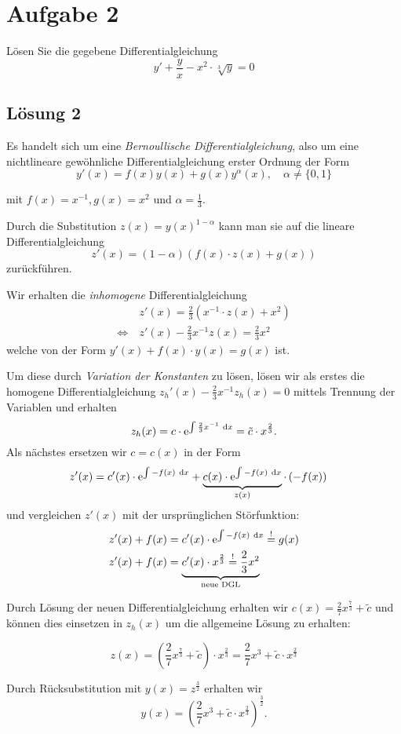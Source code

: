 \documentclass[main.tex]{subfiles}
\begin{document}
\section{Aufgabe 2}
Lösen Sie die gegebene Differentialgleichung
\[
    y' + \frac{y}{x} - x^2 \cdot \sqrt[3]{y} = 0
\]

\subsection{Lösung 2}

Es handelt sich um eine \textit{Bernoullische Differentialgleichung}, also um eine nichtlineare gewöhnliche Differentialgleichung erster Ordnung der Form
$$
    y'(x)=f(x)y(x) + g(x)y^\alpha(x), \quad \alpha \neq \{0,1\}
$$

mit $f(x)= x^{-1}, g(x)=x^2$ und $\alpha = \frac{1}{3}$.

Durch die Substitution $z(x) = y(x)^{1-\alpha}$ kann man sie auf die lineare Differentialgleichung
$$
    z'(x) = (1-\alpha)\left( f(x)\cdot z(x) + g(x) \right)
$$
zurückführen.

Wir erhalten die \textit{inhomogene} Differentialgleichung
\begin{align*}
    & z'(x) = \frac{2}{3}\left( x^{-1}\cdot z(x) + x^2 \right) \\[2mm]
    \Leftrightarrow\ & z'(x) - \frac{2}{3} x^{-1} z(x) = \frac{2}{3} x^2
\end{align*}
welche von der Form $y'(x) + f(x)\cdot y(x) = g(x)$ ist.

Um diese durch \textit{Variation der Konstanten} zu lösen, lösen wir als erstes die homogene Differentialgleichung $z_h'(x) - \frac{2}{3} x^{-1} z_h(x) = 0$ mittels Trennung der Variablen und erhalten
$$
    z_h(x)
    = c\cdot \mathrm{e}^{\int \frac{2}{3} x^{-1} ~\mathrm{d}x}
    = \tilde{c}\cdot x^{\frac{2}{3}}.
$$
Als nächstes ersetzen wir $c = c(x)$ in der Form
\begin{align*}
    z'(x) &= c'(x)\cdot \mathrm{e}^{\int -f(x)~\mathrm{d}x} + \underbrace{c(x)\cdot \mathrm{e}^{\int -f(x)~\mathrm{d}x}}_{z(x)} \cdot \left(-f(x)\right)
\end{align*}
und vergleichen $z'(x)$ mit der ursprünglichen Störfunktion:
\begin{align*}
    z'(x) + f(x) &= c'(x)\cdot \mathrm{e}^{\int -f(x)~\mathrm{d}x} \overset{!}{=} g(x) \\
    z'(x) + f(x) &= \underbrace{c'(x)\cdot x^\frac{2}{3} \overset{!}{=} \frac{2}{3} x^2}_{\text{neue DGL}}
\end{align*}

Durch Lösung der neuen Differentialgleichung erhalten wir $c(x) = \frac{2}{7} x^{\frac{7}{3}} + \tilde{c}$  und können dies einsetzen in $z_h(x)$ um die allgemeine Lösung zu erhalten:

$$
    z(x) = \left(\frac{2}{7} x^{\frac{7}{3}} +\tilde{c}\right) \cdot x^{\frac{2}{3}} = \frac{2}{7} x^3 + \tilde{c}\cdot x^{\frac{2}{3}}
$$

Durch Rücksubstitution mit $y(x) = z^{\frac{3}{2}}$ erhalten wir
$$
    y(x) = \left( \frac{2}{7} x^3 + \tilde{c}\cdot x^{\frac{2}{3}} \right)^\frac{3}{2}.
$$


\pagebreak
\end{document}
